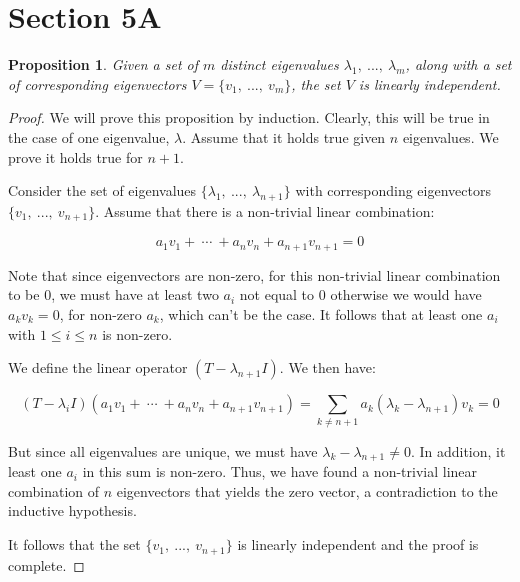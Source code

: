 \documentclass[10pt, oneside]{article}
\newenvironment{problem}[2][Problem]{\begin{trivlist}
\item[\hskip \labelsep {\bfseries #1}\hskip \labelsep {\bfseries #2.}]}{\end{trivlist}}
\newtheorem{prop}{Proposition}
\begin{document}
    \begin{problem}{}

      \end{problem}

    \section{Section 5A}

    \begin{prop}
      Given a set of $m$ distinct eigenvalues $\lambda_1, \ ..., \ \lambda_m$, along with a set of corresponding eigenvectors $V = \{v_1, \ ..., \ v_m\}$, the
      set $V$ is linearly independent.
    \end{prop}

    \begin{proof}

      We will prove this proposition by induction. Clearly, this will be true in the case of one eigenvalue, $\lambda$. Assume that
      it holds true given $n$ eigenvalues. We prove it holds true for $n + 1$.

      Consider the set of eigenvalues $\{\lambda_1, \ ..., \ \lambda_{n + 1}\}$ with
      corresponding eigenvectors $\{v_1, \ ..., \ v_{n + 1}\}$.
      Assume that there is a non-trivial linear combination:

      $$a_{1} v_1 + \ \cdots \ + a_{n} v_{n} + a_{n + 1} v_{n + 1} = 0$$

      Note that since eigenvectors are non-zero, for this non-trivial linear combination to be $0$, we must have at least two $a_i$ not equal to
      $0$ otherwise we would have $a_k v_k = 0$, for non-zero $a_k$, which can't be the case. It follows that at least one $a_i$ with $1 \leq i \leq n$
      is non-zero.


      We define the linear operator $(T - \lambda_{n + 1} I)$. We then have:

      $$(T - \lambda_i I)(a_1 v_1 + \ \cdots \ + a_n v_n + a_{n + 1} v_{n + 1}) = \displaystyle\sum_{k \neq n + 1} a_k (\lambda_k - \lambda_{n + 1}) v_k = 0$$

      But since all eigenvalues are unique, we must have $\lambda_k - \lambda_{n + 1} \neq 0$. In addition, it least one $a_i$ in this sum is non-zero. Thus,
      we have found a non-trivial linear combination of $n$ eigenvectors that yields the zero vector, a contradiction to the inductive hypothesis.
      \newline

      It follows that the set $\{v_1, \ ..., \ v_{n + 1}\}$ is linearly independent and the proof is complete.

      \end{proof}
\end{document}
